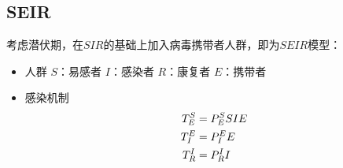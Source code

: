 \subsection{SEIR}
\par 考虑潜伏期，在$SIR$的基础上加入病毒携带者人群，即为$SEIR$模型：
\begin{itemize}
	\item 人群
	\subitem $S$：易感者
	\subitem $I$：感染者
	\subitem $R$：康复者
	\subitem $E$：携带者
	\item 感染机制
	\subitem
	\begin{align}
	T^{S}_{E}&=P^{S}_{E}SIE\\
	T^{E}_{I}&=P^{E}_{I}E\\
	T^{I}_{R}&=P^{I}_{R}I
	\end{align}
	
\end{itemize}
